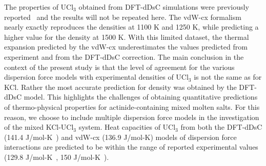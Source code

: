 \documentclass[preprint,3p,10pt,number,sort&compress]{elsarticle}
\begin{document}
The properties of UCl$_3$ obtained from DFT-dDsC simulations were previously reported~\cite{Andersson} and the results will not be repeated here. The vdW-cx formalism nearly exactly reproduces the densities at 1100 K and 1250 K, while predicting a higher value for the density at 1500 K. With this limited dataset, the thermal expansion predicted by the vdW-cx underestimates the values predicted from experiment and from the DFT-dDsC correction. The main conclusion in the context of the present study is that the level of agreement for the various dispersion force models with experimental densities of UCl$_3$ is not the same as for KCl. Rather the most accurate prediction for density was obtained by the DFT-dDsC model. This highlights the challenges of obtaining quantitative predictions of thermo-physical properties for actinide-containing mixed molten salts. For this reason, we choose to include multiple dispersion force models in the investigation of the mixed KCl-UCl$_3$ system. Heat capacities of UCl$_3$ from both the DFT-dDsC (141.4 J/mol-K~\cite{Andersson}) and vdW-cx (136.9 J/mol-K) models of dispersion force interactions are predicted to be within the range of reported experimental values (129.8 J/mol-K~\cite{YIN2020}, 150 J/mol-K~\cite{BENES2008}).
\end{document}
